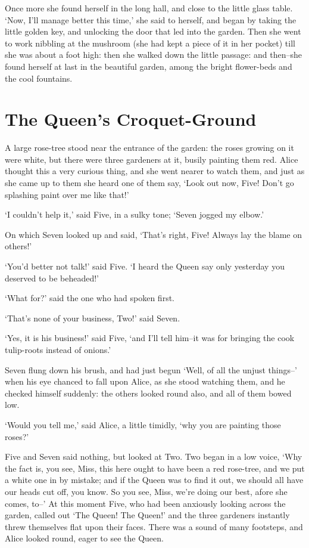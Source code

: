 \documentclass[statementpaper,twoside,openany]{memoir}
\begin{document}
Once more she found herself in the long hall, and close to the little glass table. `Now, I'll manage better this time,' she said to herself, and began by taking the little golden key, and unlocking the door that led into the garden. Then she went to work nibbling at the mushroom (she had kept a piece of it in her pocket) till she was about a foot high: then she walked down the little passage: and then--she found herself at last in the beautiful garden, among the bright flower-beds and the cool fountains.

\chapter{The Queen's Croquet-Ground}

A large rose-tree stood near the entrance of the garden: the roses growing on it were white, but there were three gardeners at it, busily painting them red. Alice thought this a very curious thing, and she went nearer to watch them, and just as she came up to them she heard one of them say, `Look out now, Five! Don't go splashing paint over me like that!'

`I couldn't help it,' said Five, in a sulky tone; `Seven jogged my elbow.'

On which Seven looked up and said, `That's right, Five! Always lay the blame on others!'

`You'd better not talk!' said Five. `I heard the Queen say only yesterday you deserved to be beheaded!'

`What for?' said the one who had spoken first.

`That's none of your business, Two!' said Seven.

`Yes, it is his business!' said Five, `and I'll tell him--it was for bringing the cook tulip-roots instead of onions.'

Seven flung down his brush, and had just begun `Well, of all the unjust things--' when his eye chanced to fall upon Alice, as she stood watching them, and he checked himself suddenly: the others looked round also, and all of them bowed low.

`Would you tell me,' said Alice, a little timidly, `why you are painting those roses?'

Five and Seven said nothing, but looked at Two. Two began in a low voice, `Why the fact is, you see, Miss, this here ought to have been a red rose-tree, and we put a white one in by mistake; and if the Queen was to find it out, we should all have our heads cut off, you know. So you see, Miss, we're doing our best, afore she comes, to--' At this moment Five, who had been anxiously looking across the garden, called out `The Queen! The Queen!' and the three gardeners instantly threw themselves flat upon their faces. There was a sound of many footsteps, and Alice looked round, eager to see the Queen.
\end{document}
